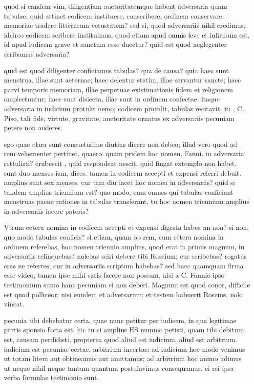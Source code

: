  quod si eandem vim, diligentiam auctoritatemque habent adversaria quam tabulae, quid attinet codicem instituere, conscribere, ordinem conservare, memoriae tradere litterarum vetustatem? sed si, quod adversariis nihil credimus, idcirco codicem scribere instituimus, quod etiam apud omnis leve et infirmum est, id apud iudicem grave et sanctum esse ducetur? quid est quod neglegenter scribamus adversaria?

 quid est quod diligenter conficiamus tabulas? qua de causa? quia haec sunt menstrua, illae sunt aeternae; haec delentur statim, illae servantur sancte; haec parvi temporis memoriam, illae perpetuae existimationis fidem et religionem amplectuntur; haec sunt disiecta, illae sunt in ordinem confectae. itaque adversaria in iudicium protulit nemo; codicem protulit, tabulas recitavit. tu , C. Piso, tali fide, virtute, gravitate, auctoritate ornatus ex adversariis pecuniam petere non auderes.

 ego quae clara sunt consuetudine diutius dicere non debeo; illud vero quod ad rem vehementer pertinet, quaero: quam pridem hoc nomen, Fanni, in adversaria rettulisti? erubescit , quid respondeat nescit, quid fingat extemplo non habet. sunt duo menses iam, dices. tamen in codicem accepti et expensi referri debuit. amplius sunt sex menses. cur tam diu iacet hoc nomen in adversariis? quid si tandem amplius triennium est? quo modo, cum omnes qui tabulas conficiant menstruas paene rationes in tabulas transferant, tu hoc nomen triennium amplius in adversariis iacere pateris?

 Vtrum cetera nomina in codicem accepti et expensi digesta habes an non? si non, quo modo tabulas conficis? si etiam, quam ob rem, cum cetera nomina in ordinem referebas, hoc nomen triennio amplius, quod erat in primis magnum, in adversariis relinquebas? nolebas sciri debere tibi Roscium; cur scribebas? rogatus eras ne referres; cur in adversariis scriptum habebas? sed haec quamquam firma esse video, tamen ipse mihi satis facere non possum, nisi a C. Fannio ipso testimonium sumo hanc pecuniam ei non deberi. Magnum est quod conor, difficile est quod polliceor; nisi eundem et adversarium et testem habuerit Roscius, nolo vincat.

 pecunia tibi debebatur certa, quae nunc petitur per iudicem, in qua legitimae partis sponsio facta est. hic tu si amplius HS nummo petisti, quam tibi debitum est, causam perdidisti, propterea quod aliud est iudicium, aliud est arbitrium. iudicium est pecuniae certae, arbitrium incertae; ad iudicium hoc modo venimus ut totam litem aut obtineamus aut amittamus; ad arbitrium hoc animo adimus ut neque nihil neque tantum quantum postulavimus consequamur. ei rei ipsa verba formulae testimonio sunt.

